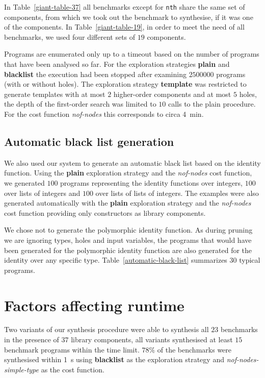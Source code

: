 In Table~\ref{giant-table-37} all benchmarks except for \lstinline?nth? share the same set of components, from which we took out the benchmark to synthesise, if it was one of the components. In Table~\ref{giant-table-19}, in order to meet the need of all benchmarks, we used four different sets of $19$ components.

Programs are enumerated only up to a timeout based on the number of programs that have been analysed so far. For the exploration strategies \textbf{plain} and \textbf{blacklist} the execution had been stopped after examining $2500000$ programs (with or without holes). The exploration strategy \textbf{template} was restricted to generate templates with at most $2$ higher-order components and at most $5$ holes, the depth of the first-order search was limited to $10$ calls to the plain procedure. For the cost function \textit{nof-nodes} this corresponds to circa \SI{4}{min}.

\subsection{Automatic black list generation}\label{Black list generation}
We also used our system to generate an automatic black list based on the identity function. Using the \textbf{plain} exploration strategy and the \textit{nof-nodes} cost function, we generated $100$ programs representing the identity functions over integers, $100$ over lists of integers and $100$ over lists of lists of integers. The examples were also generated automatically with the \textbf{plain} exploration strategy and the \textit{nof-nodes} cost function providing only constructors as library components.

We chose not to generate the polymorphic identity function. As during pruning we are ignoring types, holes and input variables, the programs that would have been generated for the polymorphic identity function are also generated for the identity over any specific type.
Table~\ref{automatic-black-list} summarizes $30$ typical programs.


\section{Factors affecting runtime}\label{Factors affecting runtime}
Two variants of our synthesis procedure were able to synthesis all $23$ benchmarks in the presence of $37$ library components, all variants synthesised at least $15$ benchmark programs within the time limit. $78\%$ of the benchmarks were synthesised within \SI{1}{s} using \textbf{blacklist} as the exploration strategy and \textit{nof-nodes-simple-type} as the cost function.

